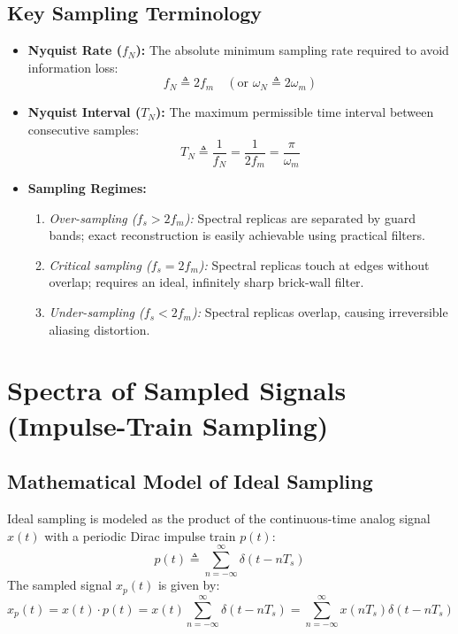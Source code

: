 \documentclass[12pt,a4paper]{article}
\begin{document}
\subsection{Key Sampling Terminology}
\begin{itemize}[topsep=2pt, itemsep=3pt]
  \item \textbf{Nyquist Rate ($f_N$):} The absolute minimum sampling rate required to avoid information loss:
  \begin{equation}
    f_N \triangleq 2 f_m \quad (\text{or } \omega_N \triangleq 2 \omega_m)
  \end{equation}
  \item \textbf{Nyquist Interval ($T_N$):} The maximum permissible time interval between consecutive samples:
  \begin{equation}
    T_N \triangleq \frac{1}{f_N} = \frac{1}{2 f_m} = \frac{\pi}{\omega_m}
  \end{equation}
  \item \textbf{Sampling Regimes:}
  \begin{enumerate}[topsep=2pt, itemsep=2pt]
    \item \textit{Over-sampling ($f_s > 2 f_m$):} Spectral replicas are separated by guard bands; exact reconstruction is easily achievable using practical filters.
    \item \textit{Critical sampling ($f_s = 2 f_m$):} Spectral replicas touch at edges without overlap; requires an ideal, infinitely sharp brick-wall filter.
    \item \textit{Under-sampling ($f_s < 2 f_m$):} Spectral replicas overlap, causing irreversible aliasing distortion.
  \end{enumerate}
\end{itemize}

\section{Spectra of Sampled Signals (Impulse-Train Sampling)}

\subsection{Mathematical Model of Ideal Sampling}
Ideal sampling is modeled as the product of the continuous-time analog signal $x(t)$ with a periodic Dirac impulse train $p(t)$:
\begin{equation}
  p(t) \triangleq \sum_{n=-\infty}^{\infty} \delta(t - n T_s)
\end{equation}
The sampled signal $x_p(t)$ is given by:
\begin{equation}
  x_p(t) = x(t) \cdot p(t) = x(t) \sum_{n=-\infty}^{\infty} \delta(t - n T_s) = \sum_{n=-\infty}^{\infty} x(n T_s) \delta(t - n T_s)
\end{equation}
\end{document}
